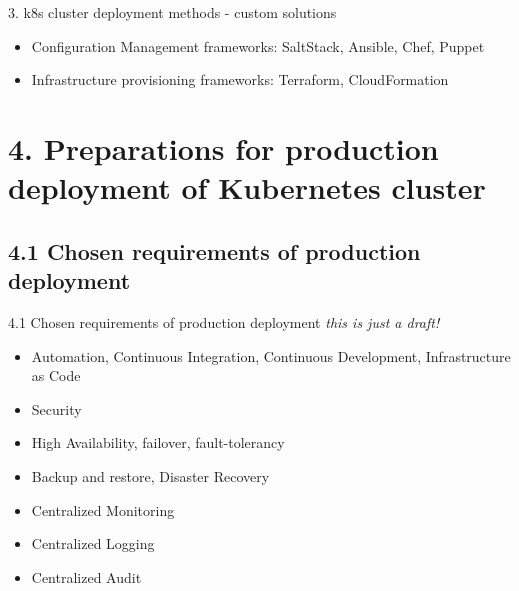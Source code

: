 \documentclass{beamer}
\begin{document}
\begin{frame}{3. k8s cluster deployment methods - custom solutions}%
\begin{itemize}
	\item Configuration Management frameworks: SaltStack, Ansible, Chef, Puppet
	\item Infrastructure provisioning frameworks: Terraform, CloudFormation
\end{itemize}
\end{frame}

\section{4. Preparations for production deployment of Kubernetes cluster}
\subsection{4.1 Chosen requirements of production deployment}
\begin{frame}{4.1 Chosen requirements of production deployment}%
	\textit{this is just a draft!}
	\begin{itemize}
		\item Automation, Continuous Integration, Continuous Development, Infrastructure as Code
		\item Security
		\item High Availability, failover, fault-tolerancy
		\item Backup and restore, Disaster Recovery
		\item Centralized Monitoring
		\item Centralized Logging
		\item Centralized Audit
	\end{itemize}
\end{frame}
\end{document}
